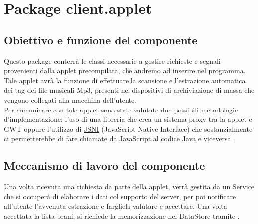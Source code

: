 \section{Package client.applet} %
\subsection*{Obiettivo e funzione del componente}
Questo package conterr\`a le classi necessarie a gestire richieste e segnali
provenienti dalla applet precompilata, che andremo ad inserire nel programma.
Tale applet avr\`a la funzione di effettuare la scansione e l'estrazione
automatica dei tag dei file musicali Mp3, presenti nei dispositivi di
archiviazione di massa che vengono collegati alla macchina dell'utente.\\
Per comunicare con tale applet sono state valutate due possibili metodologie
d'implementazione: l'uso di una libreria che crea un sistema proxy tra la applet
e GWT oppure l'utilizzo di \underline{JSNI} (JavaScript Native Interface) che
sostanzialmente ci permetterebbe di fare chiamate da JavaScript al codice
\underline{Java} e viceversa.

\subsection*{Meccanismo di lavoro del componente}
Una volta ricevuta una richiesta da parte della applet, verr\`a gestita da un
Service che si occuper\`a di elaborare i dati col supporto del server, per poi
notificare all'utente l'avvenuta estrazione e fargliela valutare e accettare.
Una volta accettata la lista brani, si richiede la memorizzazione nel DataStore
tramite .


\newpage
